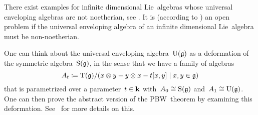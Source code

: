 \begin{remark}
  There exist examples for infinite dimensional Lie~algebras whose universal enveloping algebras are not noetherian, see \cite{uea_of_witt_algebra_not_noetherian}.
  It is (according to \cite[p.\ xix]{introduction_to_noncommutative_noetherian}) an open problem if the universal enveloping algebra of an infinite dimensional Lie~algebra must be non-noetherian.
\end{remark}


\begin{remark}
  One can think about the universal enveloping algebra~$\operatorname{U}(\mathfrak{g})$ as a deformation of the symmetric algebra~$\operatorname{S}(\mathfrak{g})$, in the sense that we have a family of algebras
  \[
    A_t
    \defined
    \Tensor(\glie)/(x \tensor y - y \tensor x - t[x,y] \suchthat x, y \in \glie)
  \]
  that is parametrized over a parameter~$t \in \mathbf{k}$ with~$A_0 \cong \operatorname{S}(\mathfrak{g})$ and~$A_1 \cong \operatorname{U}(\mathfrak{g})$.
  One can then prove the abstract version of the PBW~theorem by examining this deformation.
  See~\cite{pbw_deformation} for more details on this.
\end{remark}




